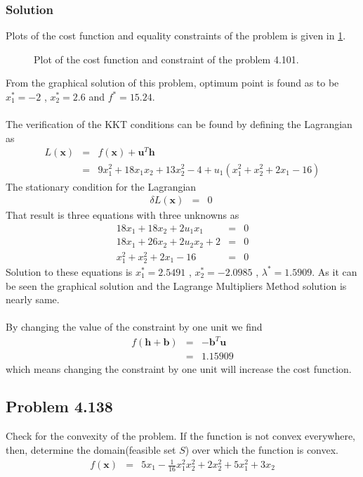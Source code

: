 \documentclass[]{report}
\begin{document}
\subsubsection*{Solution}
Plots of the cost function and equality constraints of the problem is given in \cref{fig:problem4101}.
\begin{figure}[ht!]

\caption{Plot of the cost function and constraint of the problem 4.101.}
\label{fig:problem4101}
\end{figure}
From the graphical solution of this problem, optimum point is found as to be $x_1^*=-2$ , $x_2^*=2.6$ and $f^*=15.24$.\\ 
~
\\
The verification of the KKT conditions can be found by defining the Lagrangian as
\begin{eqnarray*}
L\left(\mathbf x\right)&=&f \left(\mathbf x\right)+\mathbf{u}^T\mathbf{h}\\
&=& 9 x_1^2 +18 x_1 x_2 +13 x_2^2-4+u_1\left(x_1^2+x_2^2+2x_1-16\right)
\end{eqnarray*}
The stationary condition for the Lagrangian 
\begin{eqnarray*}
\delta L \left(\mathbf x\right) &=&0\; 
\end{eqnarray*}
That result is three equations with three unknowns as
\begin{eqnarray*}
18 x_1 +18 x_2 +2 u_1 x_1&=&0\\
18 x_1 +26 x_2 +2 u_2 x_2+2&=&0\\
x_1^2 +x_2^2 +2 x_1-16&=&0
\end{eqnarray*}
Solution to these equations is $x_1^*=2.5491$ , $x_2^*=-2.0985$ , $\lambda^*=1.5909$. As it can be seen the graphical solution and the Lagrange Multipliers Method solution is nearly same.\\~\\
By changing the value of the constraint by one unit we find
\begin{eqnarray*}
f\left(\mathbf{h}+\mathbf{b}\right)&=&-\mathbf{b}^T \mathbf{u}\\
&=& 1.15909
\end{eqnarray*}
which means changing the constraint by one unit will increase the cost function.
\subsection*{Problem 4.138}
Check for the convexity of the problem. If the function is not convex everywhere, then, determine the domain(feasible set $S$) over which the function is convex.
\begin{eqnarray*}
f\left(\mathbf x\right)&=& 5 x_1-\frac{1}{16}x_1^2x_2^2+2x_2^2+5x_1^2+3x_2
\end{eqnarray*}
\end{document}
